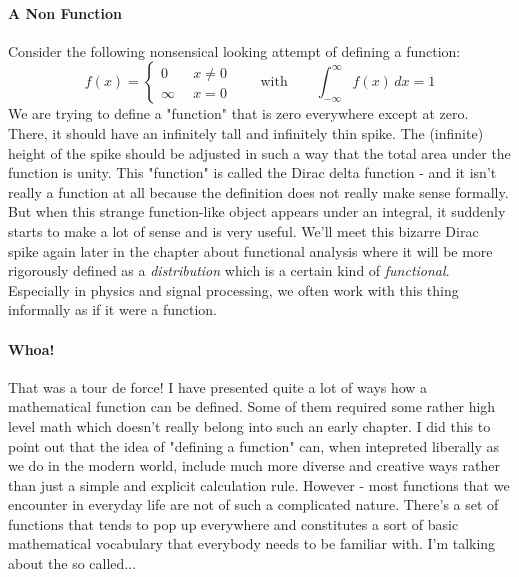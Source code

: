 
\paragraph{A Non Function}
Consider the following nonsensical looking attempt of defining a function:
\begin{equation}
f(x) = 
\begin{cases} 
0       \quad& x \neq 0 \\
\infty       & x = 0
\end{cases} \qquad \text{with} \qquad
\int_{-\infty}^{\infty} f(x) \, dx = 1
\end{equation}
We are trying to define a "function" that is zero everywhere except at zero. There, it should have an infinitely tall and infinitely thin spike. The (infinite) height of the spike should be adjusted in such a way that the total area under the function is unity. This "function" is called the Dirac delta function - and it isn't really a function at all because the definition does not really make sense formally. But when this strange function-like object appears under an integral, it suddenly starts to make a lot of sense and is very useful. We'll meet this bizarre Dirac spike again later in the chapter about functional analysis where it will be more rigorously defined as a \emph{distribution} which is a certain kind of \emph{functional}. Especially in physics and signal processing, we often work with this thing informally as if it were a function.



\paragraph{Whoa!} That was a tour de force! I have presented quite a lot of ways how a mathematical function can be defined. Some of them required some rather high level math which doesn't really belong into such an early chapter. I did this to point out that the idea of "defining a function" can, when intepreted liberally as we do in the modern world, include much more diverse and creative ways rather than just a simple and explicit calculation rule. However - most functions that we encounter in everyday life are not of such a complicated nature. There's a set of functions that tends to pop up everywhere and constitutes a sort of basic mathematical vocabulary that everybody needs to be familiar with. I'm talking about the so called...


